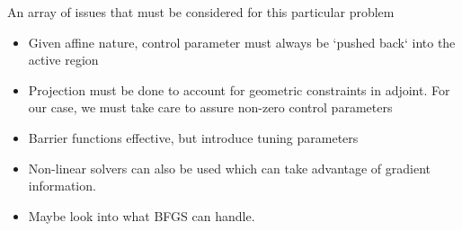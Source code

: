 An array of issues that must be considered for this particular problem

\begin{itemize}
    \item Given affine nature, control parameter must always be `pushed back` into the active region
    \item Projection must be done to account for geometric constraints in adjoint. For our case, we must take care to assure non-zero control parameters
    \item Barrier functions effective, but introduce tuning parameters
    \item Non-linear solvers can also be used which can take advantage of gradient information.
    \item Maybe look into what BFGS can handle.
\end{itemize}
